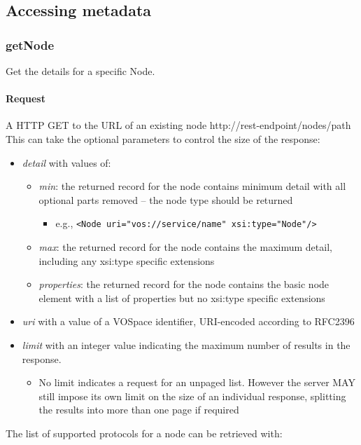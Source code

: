 \documentclass[11pt,a4paper]{ivoa}
\begin{document}
\subsection{Accessing metadata}
\label{subsec:accessing metadata}

\subsubsection{getNode}
\label{subsubsec:getnode}
Get the details for a specific Node.

\paragraph{Request}
A HTTP GET to the URL of an existing node http://rest-endpoint/nodes/path
This can take the optional parameters to control the size of the response:

\begin{itemize}
    \item \emph{detail} with values of:
    \begin{itemize}
        \item \emph{min}: the returned record for the node contains minimum detail with all optional parts removed -- the node type should be returned
        \begin{itemize}
            \item e.g., \verb|<Node uri="vos://service/name" xsi:type="Node"/>|
        \end{itemize}
        \item \emph{max}: the returned record for the node contains the maximum detail, including any xsi:type specific extensions
        \item \emph{properties}: the returned record for the node contains the basic node element with a list of properties but no xsi:type specific extensions
    \end{itemize}
    \item \emph{uri} with a value of a VOSpace identifier, URI-encoded according to RFC2396
    \item \emph{limit} with an integer value indicating the maximum number of results in the response.
    \begin{itemize}
        \item No limit indicates a request for an unpaged list. However the server MAY still impose its own limit on the size of an individual response, splitting the results into more than one page if required
     \end{itemize}
\end{itemize}
The list of supported protocols for a node can be retrieved with:
\end{document}
